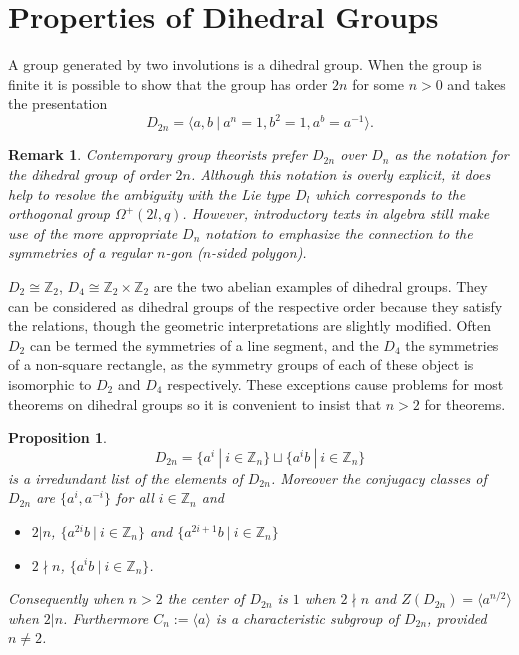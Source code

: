 \documentclass[12pt]{article}
\newtheorem{prop}[thm]{Proposition}
\newtheorem{remark}[thm]{Remark}
\providecommand{\ndivides}{\nmid}
\begin{document}
\section{Properties of Dihedral Groups}


A group generated by two involutions is a dihedral group.  When
the group is finite it is possible to show that the group has
order $2n$ for some $n>0$ and takes the presentation
\[D_{2n}=\langle a,b~|~a^n=1, b^2=1, a^b=a^{-1}\rangle.\]

\begin{remark}
Contemporary group theorists prefer $D_{2n}$ over $D_n$ as the notation for the
dihedral group of order $2n$.  Although this notation is overly explicit, it does help to resolve the ambiguity with the Lie type $D_l$ which corresponds to the orthogonal group $\Omega^+(2l,q)$.  However, introductory texts in algebra still make use of the more appropriate $D_{n}$ notation to emphasize the connection to the symmetries of a regular $n$-gon ($n$-sided polygon).
\end{remark}

$D_2\cong\mathbb{Z}_2$, $D_4\cong\mathbb{Z}_2\times \mathbb{Z}_2$ are the two abelian examples of dihedral groups.  They can be considered as dihedral groups of the respective order because they satisfy the relations, though the geometric interpretations are slightly modified.  Often $D_2$ can be termed the symmetries of a line segment, and the $D_4$ the symmetries of a non-square rectangle, as the symmetry groups of each of these object is isomorphic to $D_2$ and $D_4$ respectively.  These exceptions cause problems for most theorems on dihedral groups so it is convenient to insist that $n>2$ for theorems.

\begin{prop}
\[D_{2n}=\{a^i~|~i\in \mathbb{Z}_n\}\sqcup \{a^ib ~|~i\in \mathbb{Z}_n\}\]
is a irredundant list of the elements of $D_{2n}$.  Moreover the conjugacy
classes of $D_{2n}$ are $\{a^i, a^{-i}\}$ for all $i\in \mathbb{Z}_n$ and
\begin{itemize}
\item $2|n$, $\{a^{2i}b~|~i\in \mathbb{Z}_n\}$ and $\{a^{2i+1}b ~|~ i\in \mathbb{Z}_n\}$
\item $2\ndivides n$, $\{a^ib~|~i\in \mathbb{Z}_n\}$.
\end{itemize}
Consequently when $n>2$ the center of $D_{2n}$ is $1$ when $2\ndivides n$ and 
$Z(D_{2n})=\langle a^{n/2}\rangle$ when $2|n$.
Furthermore $C_n:=\langle a\rangle$ is a characteristic subgroup of $D_{2n}$,
provided $n\neq 2$.  
\end{prop}
\end{document}
